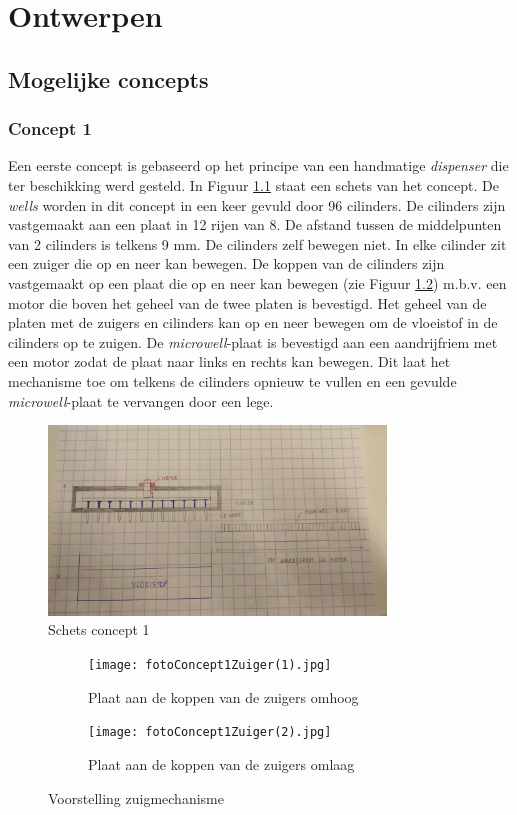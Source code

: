 \documentclass[a4paper,twoside,kulak]{kulakreport} %
\begin{document}
\chapter{Ontwerpen} 
\section{Mogelijke concepts}
\subsection{Concept 1}
Een eerste concept is gebaseerd op het principe van een handmatige \textit{dispenser} die ter beschikking werd gesteld. In Figuur \ref{fig: schets concept 1} staat een schets van het concept. De \textit{wells} worden in dit concept in een keer gevuld door 96 cilinders. De cilinders zijn vastgemaakt aan een plaat in 12 rijen van 8. De afstand tussen de middelpunten van 2 cilinders is telkens 9 mm. De cilinders zelf bewegen niet. In elke cilinder zit een zuiger die op en neer kan bewegen. De koppen van de cilinders zijn vastgemaakt op een plaat die op en neer kan bewegen (zie Figuur \ref{fig:foto concept 1 zuiger}) m.b.v. een motor die boven het geheel van de twee platen is bevestigd. Het geheel van de platen met de zuigers en cilinders kan op en neer bewegen om de vloeistof in de cilinders op te zuigen. De \textit{microwell}-plaat is bevestigd aan een aandrijfriem met een motor zodat de plaat naar links en rechts kan bewegen. Dit laat het mechanisme toe om telkens de cilinders opnieuw te vullen en een gevulde \textit{microwell}-plaat te vervangen door een lege.  

\begin{figure}[h]
	\centering
	\includegraphics[width=0.8\textwidth]{fotoConcept1.jpg}
	\caption{Schets concept 1}
	\label{fig: schets concept 1}
	
\end{figure} 

\begin{figure}
	\centering
	\begin{subfigure}{.5\textwidth}
		\centering
		\texttt{[image: fotoConcept1Zuiger(1).jpg]}
		\caption{Plaat aan de koppen van de zuigers omhoog}
	\end{subfigure}%
	\begin{subfigure}{.5\textwidth}
		\centering
		\texttt{[image: fotoConcept1Zuiger(2).jpg]}
		\caption{Plaat aan de koppen van de zuigers omlaag}
	\end{subfigure}
	\caption{Voorstelling zuigmechanisme}
	\label{fig:foto concept 1 zuiger}
\end{figure}
\end{document}

